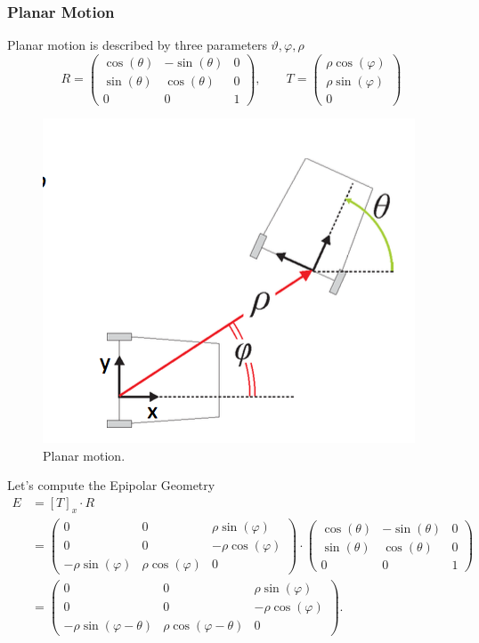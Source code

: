 \documentclass[a4paper,12 pt]{article}
\theoremstyle{definition}
\theoremstyle{remark}
\theoremstyle{definition}
\theoremstyle{definition}
\theoremstyle{definition}
\theoremstyle{remark}
\theoremstyle{definition}
\begin{document}
\subsubsection*{Planar Motion}
Planar motion is described by three parameters $\vartheta,\varphi,\rho$
\begin{equation}
R=\begin{pmatrix}
\cos(\theta)&-\sin(\theta)&0\\
\sin(\theta)&\cos(\theta)&0\\
0&0&1
\end{pmatrix}, \qquad T=\begin{pmatrix}
\rho \cos(\varphi)\\
\rho \sin(\varphi)\\
0
\end{pmatrix}
\end{equation}
\begin{figure}[h!]
\begin{center}
\includegraphics[scale=0.35]{pics/planar_motion}
\caption{Planar motion. \label{fig:planar_motion}}
\end{center}
\end{figure}
Let's compute the Epipolar Geometry
\begin{equation}
\begin{split}
E&=[T]_x\cdot R\\
&=\begin{pmatrix}
0&0&\rho \sin(\varphi)\\
0&0&-\rho \cos(\varphi)\\
-\rho \sin(\varphi)&\rho \cos(\varphi)&0
\end{pmatrix}\cdot \begin{pmatrix}
\cos(\theta)&-\sin(\theta)&0\\
\sin(\theta)&\cos(\theta)&0\\
0&0&1
\end{pmatrix}\\
&=\begin{pmatrix}
0&0&\rho \sin(\varphi)\\
0&0&-\rho \cos(\varphi)\\
-\rho \sin(\varphi-\theta)&\rho\cos(\varphi-\theta)&0
\end{pmatrix}.
\end{split}
\end{equation}
\end{document}
